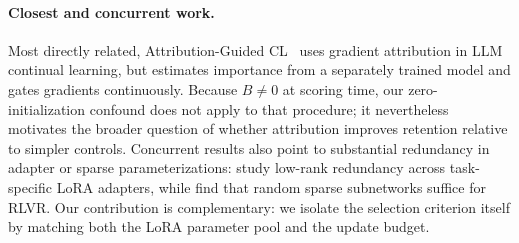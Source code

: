 \paragraph{Closest and concurrent work.}
Most directly related, Attribution-Guided CL~\citep{liu2026attributionguided} uses gradient attribution in LLM continual learning, but estimates importance from a separately trained model and gates gradients continuously. Because $B\neq0$ at scoring time, our zero-initialization confound does not apply to that procedure; it nevertheless motivates the broader question of whether attribution improves retention relative to simpler controls. Concurrent results also point to substantial redundancy in adapter or sparse parameterizations: \citet{dieudonne2026adapter} study low-rank redundancy across task-specific LoRA adapters, while \citet{adewuyi2026multiple} find that random sparse subnetworks suffice for RLVR. Our contribution is complementary: we isolate the selection criterion itself by matching both the LoRA parameter pool and the update budget.

